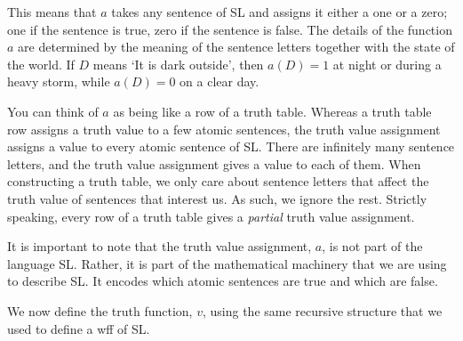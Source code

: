 

This means that $a$ takes any sentence of SL and assigns it either a one or a zero; one if the sentence is true, zero if the sentence is false. The details of the function $a$ are determined by the meaning of the sentence letters together with the state of the world. If $D$ means `It is dark outside', then $a(D)=1$ at night or during a heavy storm, while $a(D)=0$ on a clear day.

You can think of $a$ as being like a row of a truth table. Whereas a truth table row assigns a truth value to a few atomic sentences, the truth value assignment assigns a value to every atomic sentence of SL. There are infinitely many sentence letters, and the truth value assignment gives a value to each of them. When constructing a truth table, we only care about sentence letters that affect the truth value of sentences that interest us. As such, we ignore the rest. Strictly speaking, every row of a truth table gives a \emph{partial} truth value assignment.

It is important to note that the truth value assignment, $a$, is not part of the language SL. Rather, it is part of the mathematical machinery that we are using to describe SL. It encodes which atomic sentences are true and which are false.


We now define the truth function, $v$, using the same recursive structure that we used to define a wff of SL.

